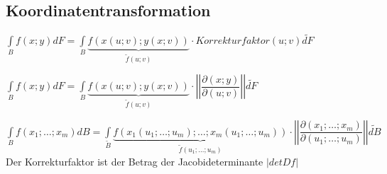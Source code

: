 \newpage

\subsection{Koordinatentransformation}
  $\int\limits_B f(x;y) dF = \int\limits_B \underbrace{f(x(u;v); y(x;v))}_{\tilde{f}(u;v)} \cdot Korrekturfaktor(u;v)   
  \tilde{dF}$
    
  $\int\limits_B f(x;y) dF = \int\limits_B \underbrace{f(x(u;v); y(x;v))}_{\tilde{f}(u;v)} \cdot 
  \left|\left|\dfrac{\partial (x;y)}{\partial (u;v)}\right|\right| \tilde{dF}$
    
  $\int\limits_B f(x_1;\ldots;x_m) dB = \int\limits_{\tilde{B}} 
  \underbrace{f(x_1(u_1;\ldots;u_m);\ldots; x_m(u_1;\ldots;u_m))}_{\tilde{f}(u_1;\ldots;u_m)} \cdot 
  \left|\left|\dfrac{\partial (x_1;\ldots;x_m)}{\partial (u_1;\ldots;u_m)}\right|\right| \tilde{dB}$ \\
   
  Der Korrekturfaktor ist der Betrag der Jacobideterminante $|detDf|$

 
